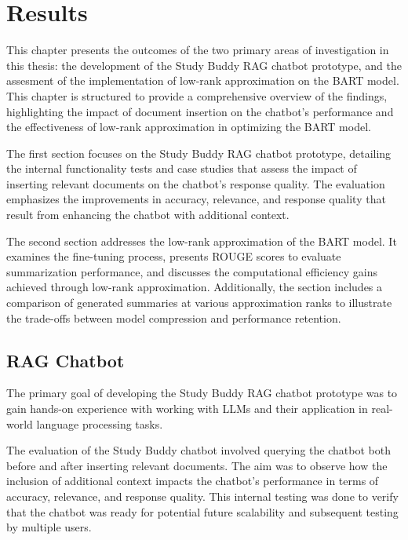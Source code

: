 \chapter{Results}\label{chap:evaluation_and_results}
This chapter presents the outcomes of the two primary areas of investigation in this thesis: the development of the Study Buddy RAG chatbot prototype, and the assesment of the implementation of low-rank approximation on the BART model. This chapter is structured to provide a comprehensive overview of the findings, highlighting the impact of document insertion on the chatbot's performance and the effectiveness of low-rank approximation in optimizing the BART model.

The first section focuses on the Study Buddy RAG chatbot prototype, detailing the internal functionality tests and case studies that assess the impact of inserting relevant documents on the chatbot's response quality. The evaluation emphasizes the improvements in accuracy, relevance, and response quality that result from enhancing the chatbot with additional context.

The second section addresses the low-rank approximation of the BART model. It examines the fine-tuning process, presents ROUGE scores to evaluate summarization performance, and discusses the computational efficiency gains achieved through low-rank approximation. Additionally, the section includes a comparison of generated summaries at various approximation ranks to illustrate the trade-offs between model compression and performance retention.

\section{RAG Chatbot}
The primary goal of developing the Study Buddy RAG chatbot prototype was to gain hands-on experience with working with LLMs and their application in real-world language processing tasks. %

The evaluation of the Study Buddy chatbot involved querying the chatbot both before and after inserting relevant documents. The aim was to observe how the inclusion of additional context impacts the chatbot's performance in terms of accuracy, relevance, and response quality. This internal testing was done to verify that the chatbot was ready for potential future scalability and subsequent testing by multiple users.

